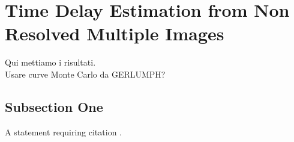 \documentclass[twoside,twocolumn]{article}
\begin{document}
\section{Time Delay Estimation from Non Resolved Multiple Images}

Qui mettiamo i risultati.
\\
Usare curve Monte Carlo da GERLUMPH?



\subsection{Subsection One}

A statement requiring citation \cite{Figueredo:2009dg}.



\nocite{*}
\onecolumn{\printbibliography}

\begin{comment}

\begin{thebibliography}{99} %

\bibitem{h0licow_I}
The H0LiCOW Collaboration,
\textit{MNRAS, Volume 468, Issue 3} (2017)

\bibitem{h0licow_XIII}
The H0LiCOW Collaboration,
\textit{MNRAS, stz3094} (2020)

\bibitem{refsdal}
S. Refsdal,
\textit{MNRAS, 128, 307} (1964)

\bibitem{cosmograil}
The COSMOGRAIL Collaboration,
\textit{arXiv:2002.05736v1} (2020)

\bibitem{weinberg_euclid}
D. Weinberg et al.,
\textit{Phys. Rep., 530, 87} (2013)

\end{thebibliography}

\end{comment}

\end{document}
